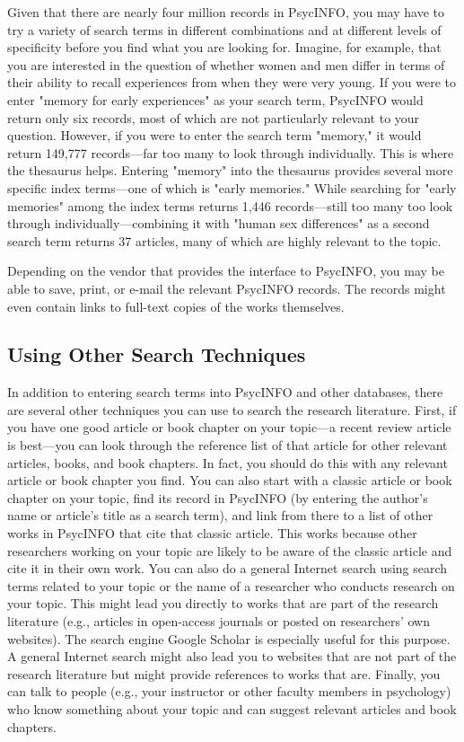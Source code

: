 Given that there are nearly four million records in PsycINFO, you may have to try a variety of search terms in different combinations and at different levels of specificity before you find what you are looking for. Imagine, for example, that you are interested in the question of whether women and men differ in terms of their ability to recall experiences from when they were very young. If you were to enter "memory for early experiences" as your search term, PsycINFO would return only six records, most of which are not particularly relevant to your question. However, if you were to enter the search term "memory," it would return 149,777 records---far too many to look through individually. This is where the thesaurus helps. Entering "memory" into the thesaurus provides several more specific index terms---one of which is "early memories." While searching for "early memories" among the index terms returns 1,446 records---still too many too look through individually---combining it with "human sex differences" as a second search term returns 37 articles, many of which are highly relevant to the topic.

Depending on the vendor that provides the interface to PsycINFO, you may be able to save, print, or e-mail the relevant PsycINFO records. The records might even contain links to full-text copies of the works themselves.

\subsection{Using Other Search Techniques}

In addition to entering search terms into PsycINFO and other databases, there are several other techniques you can use to search the research literature. First, if you have one good article or book chapter on your topic---a recent review article is best---you can look through the reference list of that article for other relevant articles, books, and book chapters. In fact, you should do this with any relevant article or book chapter you find. You can also start with a classic article or book chapter on your topic, find its record in PsycINFO (by entering the author's name or article's title as a search term), and link from there to a list of other works in PsycINFO that cite that classic article. This works because other researchers working on your topic are likely to be aware of the classic article and cite it in their own work. You can also do a general Internet search using search terms related to your topic or the name of a researcher who conducts research on your topic. This might lead you directly to works that are part of the research literature (e.g., articles in open-access journals or posted on researchers' own websites). The search engine Google Scholar is especially useful for this purpose. A general Internet search might also lead you to websites that are not part of the research literature but might provide references to works that are. Finally, you can talk to people (e.g., your instructor or other faculty members in psychology) who know something about your topic and can suggest relevant articles and book chapters.

